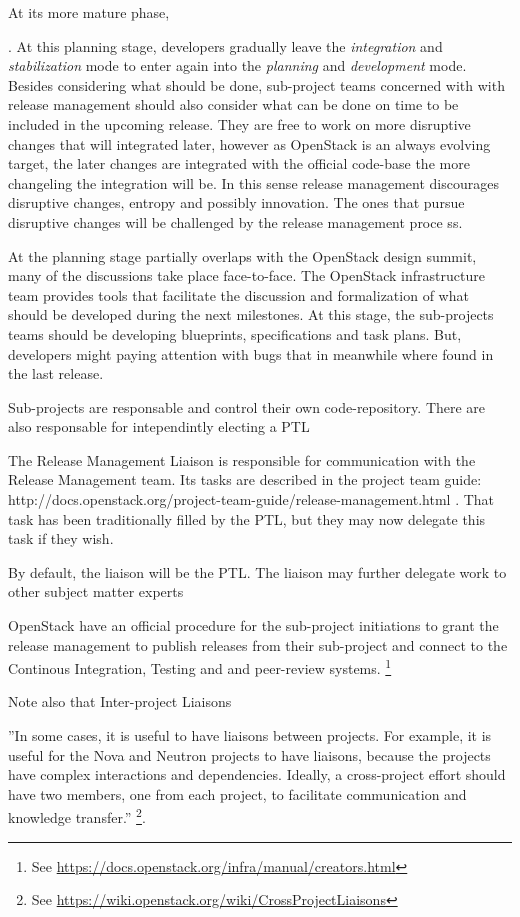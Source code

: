 \documentclass[dvipsnames]{interact}
\theoremstyle{plain}\newtheorem{theorem}{Theorem}[section]
\theoremstyle{definition}
\theoremstyle{remark}
\newenvironment{newStuff}{
    \begin{color}{Sepia}
    \begin{tabular}{|p{1.0\textwidth}|}
    \hline\\
    }
    { 
    \\\\\hline
    \end{tabular} 
    \end{color}
    }
\renewenvironment{newStuff}{}{}
\begin{document}
\begin{newStuff}
At its more mature phase, 

.  At this planning stage, developers gradually leave the \textit{integration} and \textit{stabilization} mode to enter again into the \textit{planning} and \textit{development} mode. Besides considering what should be done, sub-project teams concerned with with release management should also consider what can be done on time to be included in the upcoming release. They are free to work on more disruptive changes that will integrated later, however as OpenStack is an always evolving target, the later changes are integrated with the official code-base the more changeling the integration will be.   In this sense release management discourages disruptive changes, entropy and possibly innovation. The ones that pursue disruptive changes will be challenged by the release management proce
ss.

At the planning stage  partially overlaps with the OpenStack design summit, many of the discussions take place face-to-face.  The OpenStack 
 infrastructure team provides  tools that facilitate the discussion and formalization of what should be developed during the next milestones.
 At this stage, the sub-projects teams should be developing blueprints, specifications and  task plans.  But, developers might paying attention with bugs that in meanwhile where found in the last release. 
 
Sub-projects are responsable and control their own code-repository. There are also responsable for intependintly electing a PTL 

The Release Management Liaison is responsible for communication with the Release Management team. Its tasks are described in the project team guide: http://docs.openstack.org/project-team-guide/release-management.html . That task has been traditionally filled by the PTL, but they may now delegate this task if they wish.

    By default, the liaison will be the PTL.
    The liaison may further delegate work to other subject matter experts


OpenStack have an official procedure for the sub-project initiations to grant the release management to publish releases from their sub-project and connect to the Continous Integration, Testing and and peer-review systems.
\footnote{See \url{https://docs.openstack.org/infra/manual/creators.html}} 


Note also that 
Inter-project Liaisons

''In some cases, it is useful to have liaisons between projects. For example, it is useful for the Nova and Neutron projects to have liaisons, because the projects have complex interactions and dependencies. Ideally, a cross-project effort should have two members, one from each project, to facilitate communication and knowledge transfer.'' \footnote{See \url{https://wiki.openstack.org/wiki/CrossProjectLiaisons}}.



\end{newStuff}
\end{document}
